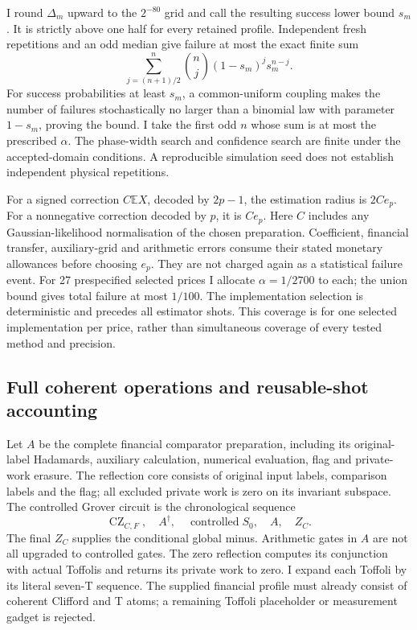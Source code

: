 I round $\Delta_m$ upward to the $2^{-80}$ grid and call the resulting
success lower bound $s_m$. It is strictly above one half for every retained
profile. Independent fresh repetitions and an odd median give failure at
most the exact finite sum
\begin{equation}
 \sum_{j=(n+1)/2}^n\binom nj(1-s_m)^j s_m^{n-j}.
 \label{eq:integral-confidence-binomial}
\end{equation}
For success probabilities at least $s_m$, a common-uniform coupling makes
the number of failures stochastically no larger than a binomial law with
parameter $1-s_m$, proving the bound. I take the first odd $n$ whose sum
is at most the prescribed $\alpha$. The phase-width search and confidence
search are finite under the accepted-domain conditions. A reproducible
simulation seed does not establish independent physical repetitions.

For a signed correction $C\mathbb E X$, decoded by $2p-1$, the estimation
radius is $2C e_p$. For a nonnegative correction decoded by $p$, it is
$C e_p$. Here $C$ includes any Gaussian-likelihood normalisation of the
chosen preparation. Coefficient, financial transfer, auxiliary-grid and
arithmetic errors consume their stated monetary allowances before choosing
$e_p$. They are not charged again as a statistical failure event.
For 27 prespecified selected prices I allocate $\alpha=1/2700$ to each;
the union bound gives total failure at most $1/100$. The implementation
selection is deterministic and precedes all estimator shots. This coverage
is for one selected implementation per price, rather than simultaneous
coverage of every tested method and precision.

\subsection{Full coherent operations and reusable-shot accounting}

Let $A$ be the complete financial comparator preparation, including its
original-label Hadamards, auxiliary calculation, numerical evaluation,
flag and private-work erasure. The reflection core consists of original
input labels, comparison labels and the flag; all excluded private work is
zero on its invariant subspace. The controlled Grover circuit is the
chronological sequence
\[
 \operatorname{CZ}_{C,F},\quad A^\dagger,\quad
       \operatorname{controlled}S_0,\quad A,\quad Z_C.
\]
The final $Z_C$ supplies the conditional global minus. Arithmetic gates in
$A$ are not all upgraded to controlled gates. The zero reflection computes
its conjunction with actual Toffolis and returns its private work to zero.
I expand each Toffoli by its literal seven-T sequence. The supplied
financial profile must already consist of coherent Clifford and T atoms;
a remaining Toffoli placeholder or measurement gadget is rejected.

